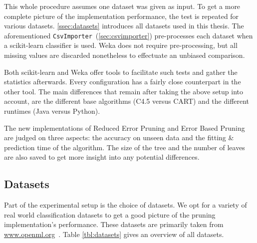 This whole procedure assumes one dataset was given as input. To get a more complete picture of the implementation performance, the test is repeated for various datasets. \autoref{ssec:datasets} introduces all datasets used in this thesis. The aforementioned \texttt{CsvImporter}~(\autoref{sec:csvimporter}) pre-processes each dataset when a scikit-learn classifier is used. Weka does not require pre-processing, but all missing values are discarded nonetheless to effectuate an unbiased comparison.

Both scikit-learn and Weka offer tools to facilitate such tests and gather the statistics afterwards. Every configuration has a fairly close counterpart in the other tool. The main differences that remain after taking the above setup into account, are the different base algorithms (C4.5 versus CART) and the different runtimes (Java versus Python).

The new implementations of Reduced Error Pruning and Error Based Pruning are judged on three aspects: the accuracy on unseen data and the fitting \& prediction time of the algorithm. The size of the tree and the number of leaves are also saved to get more insight into any potential differences.

\subsection{Datasets}
\label{ssec:datasets}
Part of the experimental setup is the choice of datasets. We opt for a variety of real world classification datasets to get a good picture of the pruning implementation's performance. These datasets are primarily taken from \url{www.openml.org}~\cite{openml}. Table \ref{tbl:datasets} gives an overview of all datasets.

